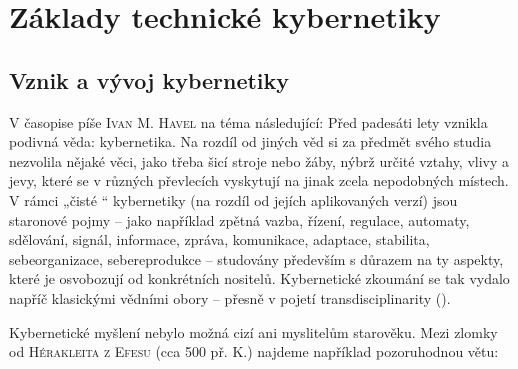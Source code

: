 \setchaptertoc
\chapter{Základy technické kybernetiky}\label{tky:IchapI}
  \section{Vznik a vývoj kybernetiky}\label{tky:IchapIsecI}
    V časopise \casopisVesmir píše \textsc{Ivan M. Havel} na téma  následující: Před
    padesáti lety vznikla podivná věda: kybernetika. Na rozdíl od jiných věd si za předmět svého
    studia nezvolila nějaké věci, jako třeba šicí stroje nebo žáby, nýbrž určité vztahy, vlivy a
    jevy, které se v různých převlecích vyskytují na jinak zcela nepodobných místech. V rámci „čisté
    “ kybernetiky (na rozdíl od jejích aplikovaných verzí) jsou staronové pojmy – jako například
    zpětná vazba, řízení, regulace, automaty, sdělování, signál, informace, zpráva, komunikace,
    adaptace, stabilita, sebeorganizace, sebereprodukce – studovány především s důrazem na ty
    aspekty, které je osvobozují od konkrétních nositelů. Kybernetické zkoumání se tak vydalo napříč
    klasickými vědními obory – přesně v pojetí transdisciplinarity (\cite{Vesmir1998_11}).

    Kybernetické myšlení nebylo možná cizí ani myslitelům starověku. Mezi zlomky od
    \textsc{Hérakleita z Efesu} (cca 500 př. K.) najdeme například pozoruhodnou větu:
    \begin{center}
    \end{center}  


